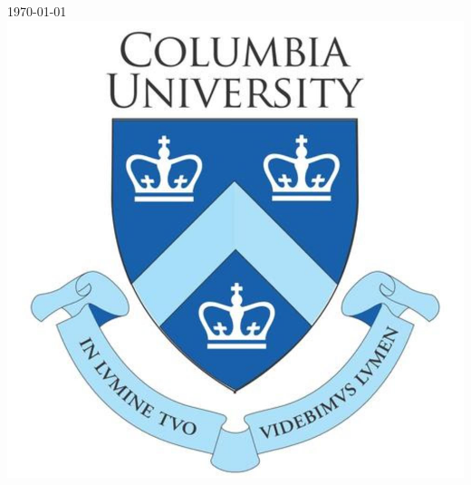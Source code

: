 \begin{titlepage}

{\large \today}\\[1cm] %


\includegraphics{CU_logo.jpg}\\[0.5cm] %
 

\vfill %

\end{titlepage}

